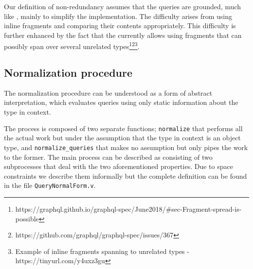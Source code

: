 Our definition of non-redundancy assumes that the queries are grounded, much like \HP{}, mainly to simplify the implementation. The difficulty arises from using inline fragments and comparing their contents appropriately. This difficulty is further enhanced by the fact that the \spec{} currently allows using fragments that can possibly span over several unrelated types\footnote{https://graphql.github.io/graphql-spec/June2018/\#sec-Fragment-spread-is-possible}\footnote{https://github.com/graphql/graphql-spec/issues/367}\footnote{Example of inline fragments spanning to unrelated types - https://tinyurl.com/y4uxz3gu}.

\subsection{Normalization procedure}\label{subsec:normalization}

The normalization procedure can be understood as a form of abstract interpretation, which evaluates queries using only static information about the type in context.

The process is composed of two separate functions; \texttt{normalize} that performs all the actual work but under the assumption that the type in context is an object type, and \texttt{normalize\_queries} that makes no assumption but only pipes the work to the former. The main process can be described as consisting of two subprocesses that deal with the two aforementioned properties. Due to space constraints we describe them informally but the complete definition can be found in the file \texttt{QueryNormalForm.v}.

